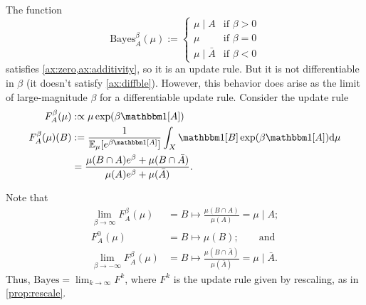 \documentclass{article}
\begin{document}
The function
\[
    \mathrm{Bayes}^\beta_A(\mu) := \begin{cases}
            \mu \mid A &  \text{if }\beta > 0 \\
            \mu & \text{if } \beta = 0 \\
            \mu \mid \bar A &  \text{if } \beta < 0
        \end{cases}
\]
satisfies \cref{ax:zero,ax:additivity}, so it is an update rule.  But it is not differentiable in $\beta$ (it doesn't satisfy \cref{ax:diffble}).
However, this behavior does arise as the limit of large-magnitude $\beta$ for a differentiable update rule. Consider the update rule
\begin{align*}
    F^\beta_A (\mu) &:\propto \mu \exp(\beta \mathbbm1[A]) \\
    F^\beta_A (\mu)(B) &:=
        \frac{1}{\Ex_{\mu}[e^{\beta\mathbbm1[A]}]}\int_{X}  \mathbbm1[B] \exp(\beta \mathbbm1[A]) \mathrm d\mu \\
        &=
        \frac{\mu(B\cap A)e^{\beta} + \mu(B \cap \bar A) }
        {\mu(A)e^{\beta} + \mu(\bar A)}.
\end{align*}

Note that
\begin{align*}
\lim_{\beta\to\infty} F^\beta_A(\mu) &= B \mapsto \frac{\mu(B \cap A)}{\mu(A)}
   = \mu \mid A; \\
 F^0_A(\mu) &= B \mapsto \mu(B); \qquad\text{and}\\
\lim_{\beta\to-\infty} F^\beta_A(\mu) &= B \mapsto \frac{\mu(B \cap \bar A)}{\mu(\bar A)}
      = \mu \mid \bar A.
\end{align*}
Thus, $\mathrm{Bayes} = \lim_{k \to \infty} F^{k}$, where $F^k$ is the update rule given by rescaling, as in \cref{prop:rescale}.
\end{document}
